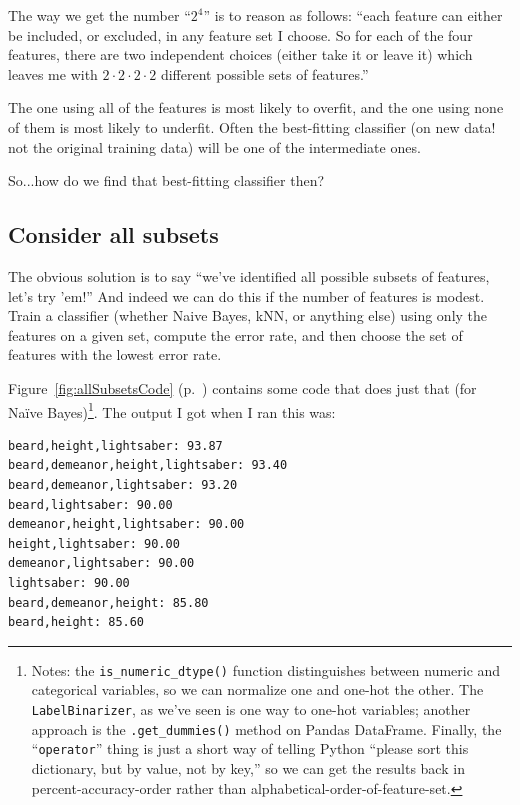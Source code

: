 The way we get the number ``$2^4$'' is to reason as follows: ``each feature can
either be included, or excluded, in any feature set I choose. So for each
of the four features, there are two independent choices (either take it or
leave it) which leaves me with $2 \cdot 2 \cdot 2 \cdot 2$ different possible
sets of features.''

The one using all of the features is most likely to overfit, and the one using
none of them is most likely to underfit. Often the best-fitting classifier (on
new data! not the original training data) will be one of the intermediate
ones.

So...how do we find that best-fitting classifier then?

\subsection{Consider all subsets}

The obvious solution is to say ``we've identified all possible subsets of
features, let's try 'em!'' And indeed we can do this if the number of features
is modest. Train a classifier (whether Naive Bayes, kNN, or anything else)
using only the features on a given set, compute the error rate, and then
choose the set of features with the lowest error rate.

Figure~\ref{fig:allSubsetsCode} (p.~\pageref{fig:allSubsetsCode}) contains
some code that does just that (for Na\"{i}ve Bayes)\footnote{Notes: the
\texttt{is\_numeric\_dtype()} function distinguishes between numeric and
categorical variables, so we can normalize one and one-hot the other. The
\texttt{LabelBinarizer}, as we've seen is one way to one-hot variables;
another approach is the \texttt{.get\_dummies()} method on Pandas DataFrame.
Finally, the ``\texttt{operator}'' thing is just a short way of telling Python
``please sort this dictionary, but by value, not by key,'' so we can get the
results back in percent-accuracy-order rather than
alphabetical-order-of-feature-set.}. The output I got when I ran this was:

\begin{Verbatim}[fontsize=\small,samepage=true,frame=none]
beard,height,lightsaber: 93.87
beard,demeanor,height,lightsaber: 93.40
beard,demeanor,lightsaber: 93.20
beard,lightsaber: 90.00
demeanor,height,lightsaber: 90.00
height,lightsaber: 90.00
demeanor,lightsaber: 90.00
lightsaber: 90.00
beard,demeanor,height: 85.80
beard,height: 85.60
\end{Verbatim}

